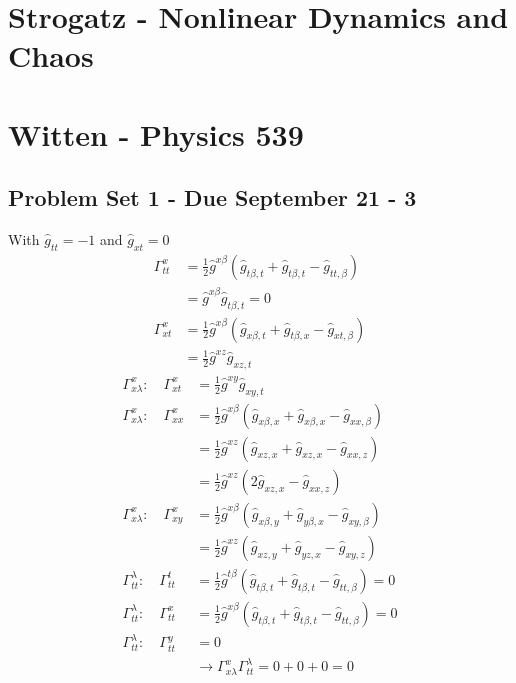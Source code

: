 \documentclass[../main.tex]{subfiles}
\begin{document}
\section{{\sc Strogatz} - Nonlinear Dynamics and Chaos}

\section{{\sc Witten} - Physics 539}
\subsection{Problem Set 1 - Due September 21 - 3}
With $\hat{g}_{tt}=-1$ and $\hat{g}_{xt}=0$
\begin{align}
\Gamma^x_{tt}&=\frac{1}{2}\hat{g}^{x\beta}(\hat{g}_{t\beta,t}+\hat{g}_{t\beta,t}-\hat{g}_{tt,\beta})\\
&=\hat{g}^{x\beta}\hat{g}_{t\beta,t}=0\\
\Gamma^x_{xt}&=\frac{1}{2}\hat{g}^{x\beta}(\hat{g}_{x\beta,t}+\hat{g}_{t\beta,x}-\hat{g}_{xt,\beta})\\
&=\frac{1}{2}\hat{g}^{xz}\hat{g}_{xz,t}
\end{align}
\begin{align}
\Gamma^x_{x\lambda}:\quad\Gamma^x_{xt}&=\frac{1}{2}\hat{g}^{xy}\hat{g}_{xy,t}\\
\Gamma^x_{x\lambda}:\quad\Gamma^x_{xx}&=\frac{1}{2}\hat{g}^{x\beta}(\hat{g}_{x\beta,x}+\hat{g}_{x\beta,x}-\hat{g}_{xx,\beta})\\
&=\frac{1}{2}\hat{g}^{xz}(\hat{g}_{xz,x}+\hat{g}_{xz,x}-\hat{g}_{xx,z})\\
&=\frac{1}{2}\hat{g}^{xz}(2\hat{g}_{xz,x}-\hat{g}_{xx,z})\\
\Gamma^x_{x\lambda}:\quad\Gamma^x_{xy}
&=\frac{1}{2}\hat{g}^{x\beta}(\hat{g}_{x\beta,y}+\hat{g}_{y\beta,x}-\hat{g}_{xy,\beta})\\
&=\frac{1}{2}\hat{g}^{xz}(\hat{g}_{xz,y}+\hat{g}_{yz,x}-\hat{g}_{xy,z})\\
\Gamma^\lambda_{tt}:\quad\Gamma^t_{tt}
&=\frac{1}{2}\hat{g}^{t\beta}(\hat{g}_{t\beta,t}+\hat{g}_{t\beta,t}-\hat{g}_{tt,\beta})=0\\
\Gamma^\lambda_{tt}:\quad\Gamma^x_{tt}
&=\frac{1}{2}\hat{g}^{x\beta}(\hat{g}_{t\beta,t}+\hat{g}_{t\beta,t}-\hat{g}_{tt,\beta})=0\\
\Gamma^\lambda_{tt}:\quad\Gamma^y_{tt}&=0\\
&\rightarrow \Gamma^x_{x\lambda}\Gamma^\lambda_{tt}=0+0+0=0
\end{align}
\end{document}
